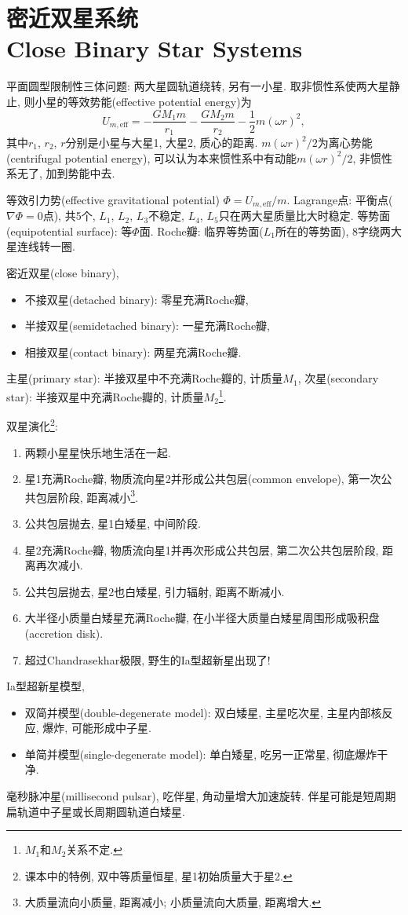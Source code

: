 \chapter{密近双星系统\\Close Binary Star Systems}

平面圆型限制性三体问题: 两大星圆轨道绕转, 另有一小星. 取非惯性系使两大星静止, 则小星的等效势能(effective potential energy)为
\begin{equation*}
    U_{m,\text{eff}}=-\frac{GM_1m}{r_1}-\frac{GM_2m}{r_2}-\frac{1}{2}m(\omega r)^2,
\end{equation*}
其中$r_1$, $r_2$, $r$分别是小星与大星1, 大星2, 质心的距离. $m(\omega r)^2/2$为离心势能(centrifugal potential energy), 可以认为本来惯性系中有动能$m(\omega r)^2/2$, 非惯性系无了, 加到势能中去.

等效引力势(effective gravitational potential) $\Phi=U_{m,\text{eff}}/m$. Lagrange点: 平衡点($\nabla\Phi=0$点), 共5个, $L_1$, $L_2$, $L_3$不稳定, $L_4$, $L_5$只在两大星质量比大时稳定. 等势面(equipotential surface): 等$\Phi$面. Roche瓣: 临界等势面($L_1$所在的等势面), 8字绕两大星连线转一圈.

密近双星(close binary),
\begin{itemize}
    \item 不接双星(detached binary): 零星充满Roche瓣,
    \item 半接双星(semidetached binary): 一星充满Roche瓣,
    \item 相接双星(contact binary): 两星充满Roche瓣.
\end{itemize}

主星(primary star): 半接双星中不充满Roche瓣的, 计质量$M_1$, 次星(secondary star): 半接双星中充满Roche瓣的, 计质量$M_2$\footnote{$M_1$和$M_2$关系不定.}.

双星演化\footnote{课本中的特例, 双中等质量恒星, 星1初始质量大于星2.}:
\begin{enumerate}
    \item 两颗小星星快乐地生活在一起.
    \item 星1充满Roche瓣, 物质流向星2并形成公共包层(common envelope), 第一次公共包层阶段, 距离减小\footnote{大质量流向小质量, 距离减小; 小质量流向大质量, 距离增大.}.
    \item 公共包层抛去, 星1白矮星, 中间阶段.
    \item 星2充满Roche瓣, 物质流向星1并再次形成公共包层, 第二次公共包层阶段, 距离再次减小.
    \item 公共包层抛去, 星2也白矮星, 引力辐射, 距离不断减小.
    \item 大半径小质量白矮星充满Roche瓣, 在小半径大质量白矮星周围形成吸积盘(accretion disk).
    \item 超过Chandrasekhar极限, 野生的Ia型超新星出现了!
\end{enumerate}

Ia型超新星模型,
\begin{itemize}
    \item 双简并模型(double-degenerate model): 双白矮星, 主星吃次星, 主星内部核反应, 爆炸, 可能形成中子星.
    \item 单简并模型(single-degenerate model): 单白矮星, 吃另一正常星, 彻底爆炸干净.
\end{itemize}

毫秒脉冲星(millisecond pulsar), 吃伴星, 角动量增大加速旋转. 伴星可能是短周期扁轨道中子星或长周期圆轨道白矮星.
